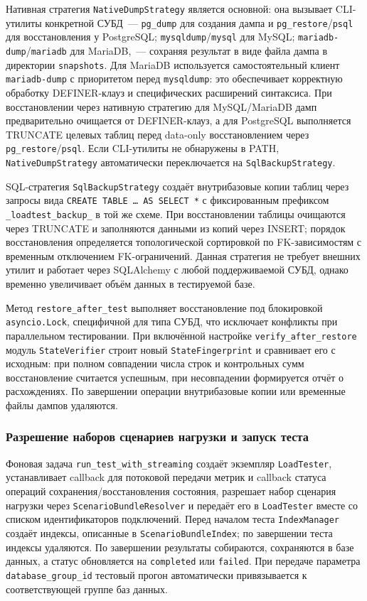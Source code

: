 Нативная стратегия \texttt{NativeDumpStrategy} является основной: она вызывает CLI-утилиты конкретной СУБД~--- \texttt{pg\_dump} для создания дампа и \texttt{pg\_restore}/\texttt{psql} для восстановления у PostgreSQL; \texttt{mysqldump}/\texttt{mysql} для MySQL; \texttt{mariadb-dump}/\texttt{mariadb} для MariaDB,~--- сохраняя результат в виде файла дампа в директории \texttt{snapshots}. Для MariaDB используется самостоятельный клиент \texttt{mariadb-dump} с приоритетом перед \texttt{mysqldump}: это обеспечивает корректную обработку DEFINER-клауз и специфических расширений синтаксиса. При восстановлении через нативную стратегию для MySQL/MariaDB дамп предварительно очищается от DEFINER-клауз, а для PostgreSQL выполняется TRUNCATE целевых таблиц перед data-only восстановлением через \texttt{pg\_restore}/\texttt{psql}. Если CLI-утилиты не обнаружены в PATH, \texttt{NativeDumpStrategy} автоматически переключается на \texttt{SqlBackupStrategy}.

SQL-стратегия \texttt{SqlBackupStrategy} создаёт внутрибазовые копии таблиц через запросы вида \texttt{CREATE~TABLE~\ldots~AS~SELECT~*} с фиксированным префиксом \texttt{\_loadtest\_backup\_} в той же схеме. При восстановлении таблицы очищаются через TRUNCATE и заполняются данными из копий через INSERT; порядок восстановления определяется топологической сортировкой по FK-зависимостям с временным отключением FK-ограничений. Данная стратегия не требует внешних утилит и работает через SQLAlchemy с любой поддерживаемой СУБД, однако временно увеличивает объём данных в тестируемой базе.

Метод \texttt{restore\_after\_test} выполняет восстановление под блокировкой \texttt{asyncio.Lock}, специфичной для типа СУБД, что исключает конфликты при параллельном тестировании. При включённой настройке \texttt{verify\_after\_restore} модуль \texttt{StateVerifier} строит новый \texttt{StateFingerprint} и сравнивает его с исходным: при полном совпадении числа строк и контрольных сумм восстановление считается успешным, при несовпадении формируется отчёт о расхождениях. По завершении операции внутрибазовые копии или временные файлы дампов удаляются.

\subsubsection{Разрешение наборов сценариев нагрузки и запуск теста}

Фоновая задача \texttt{run\_test\_with\_streaming} создаёт экземпляр \texttt{LoadTester}, устанавливает callback для потоковой передачи метрик и callback статуса операций сохранения/восстановления состояния, разрешает набор сценария нагрузки через \texttt{ScenarioBundleResolver} и передаёт его в \texttt{LoadTester} вместе со списком идентификаторов подключений. Перед началом теста \texttt{IndexManager} создаёт индексы, описанные в \texttt{ScenarioBundleIndex}; по завершении теста индексы удаляются. По завершении результаты собираются, сохраняются в базе данных, а статус обновляется на \texttt{completed} или \texttt{failed}. При передаче параметра \texttt{database\_group\_id} тестовый прогон автоматически привязывается к соответствующей группе баз данных.

